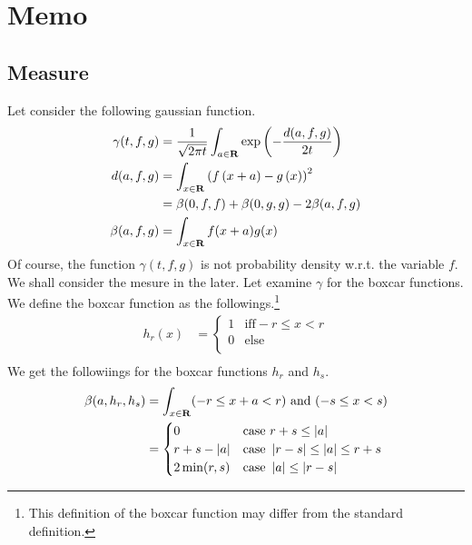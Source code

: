 \section{Memo}\label{sec:memorandom}
\newcommand{\rmapr}{M_{\mybf{R}}\mybf{R}}
\newcommand{\nmapr}{M_{\mybf{R}}\mybf{N}}
\newcommand{\zmapr}{M_{\mybf{R}}\mybf{Z}}
\newcommand{\loner}{L\mybf{R}}
\newcommand{\intallr}[1]{\int_{{#1}\in\mybf{R}}}

\subsection{Measure}
Let consider the following gaussian function.
\begin{equation}\begin{split}\label{eq:f.gauss}
	\gamma(t,f,g) &= \frac{1}{\sqrt{2\pi t}}\intallr{a}\exp\kakko{-\frac{d(a, f,g)}{2t}} \\
	d(a,f,g) &= \intallr{x}\kakko{f\kakko{x+a}-g\kakko{x}}^2 \\
		&= \beta(0,f,f) + \beta(0,g,g) - 2\beta(a,f,g) \\
	\beta(a,f,g) &= \intallr{x}f(x+a)g(x) \\
\end{split}\end{equation}
Of course, the function $\gamma(t,f,g)$ is not probability density w.r.t. the variable $f$.
We shall consider the mesure in the later.
Let examine $\gamma$ for the boxcar functions.
We define the boxcar function as the followings.\footnote {
	This definition of the boxcar function may differ from the standard definition.
}
\begin{equation}\begin{split}
	h_r(x) &= \begin{cases}
		1 & \text{iff} -r\le x< r \\
		0 & \text{else} \\
		\end{cases}\\
\end{split}\end{equation}
We get the followiings for the boxcar functions $h_r$ and $h_s$.
\begin{equation}\begin{split}
	\beta(a,h_r,h_s) &= \intallr{x}(-r\le x+a< r)\text{ and }(-s\le x< s) \\
		&= \begin{cases}
			0 & \text{case } r+s\le\zettai{a} \\
			r+s-\zettai{a} & \text{case } \zettai{r-s}\le\zettai{a}\le r+s \\
			2\min(r,s) & \text{case } \zettai{a}\le\zettai{r-s} \\
		\end{cases}\\
\end{split}\end{equation}
